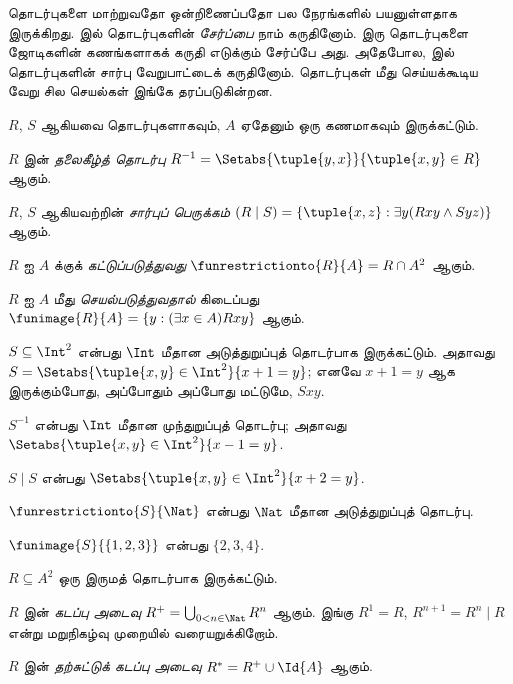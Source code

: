 \documentclass[../../../include/open-logic-section]{subfiles}
\begin{document}

தொடர்புகளை மாற்றுவதோ ஒன்றிணைப்பதோ பல நேரங்களில் பயனுள்ளதாக இருக்கிறது.
 இல் தொடர்புகளின்
\emph{சேர்ப்பை} நாம் கருதினோம். இரு தொடர்புகளை ஜோடிகளின் கணங்களாகக்
கருதி எடுக்கும் சேர்ப்பே அது. அதேபோல,
 இல் தொடர்புகளின் சார்பு
வேறுபாட்டைக் கருதினோம். தொடர்புகள் மீது செய்யக்கூடிய வேறு சில செயல்கள்
இங்கே தரப்படுகின்றன.

\begin{defn}
$R$, $S$ ஆகியவை தொடர்புகளாகவும், $A$ ஏதேனும் ஒரு கணமாகவும் இருக்கட்டும்.

$R$ இன் \emph{தலைகீழ்த் தொடர்பு}
$R^{-1} = \Setabs{\tuple{y, x}}{\tuple{x,
    y} \in R}$ ஆகும்.

$R$, $S$ ஆகியவற்றின் \emph{சார்புப் பெருக்கம்}
$(R \mid S) =
\{\tuple{x, z} : \exists y(Rxy \land Syz)\}$ ஆகும்.

$R$ ஐ $A$ க்குக் \emph{கட்டுப்படுத்துவது}
$\funrestrictionto{R}{A}= R
\cap A^2$ ஆகும்.

$R$ ஐ $A$ மீது \emph{செயல்படுத்துவதால்} கிடைப்பது
$\funimage{R}{A} = \{y :
(\exists x \in A)Rxy\}$ ஆகும்.
\end{defn}

\begin{ex}
$S \subseteq \Int^2$ என்பது $\Int$ மீதான அடுத்துறுப்புத் தொடர்பாக
இருக்கட்டும். அதாவது
$S = \Setabs{\tuple{x, y} \in \Int^2}{x + 1 = y}$; எனவே
$x + 1 = y$ ஆக இருக்கும்போது, அப்போதும் அப்போது மட்டுமே, $Sxy$.

$S^{-1}$ என்பது $\Int$ மீதான முந்துறுப்புத் தொடர்பு; அதாவது
$\Setabs{\tuple{x,y}\in\Int^2}{x -1 =y}$.

$S\mid S$ என்பது
$ \Setabs{\tuple{x,y}\in\Int^2}{x + 2 =y}$.

$\funrestrictionto{S}{\Nat}$ என்பது $\Nat$ மீதான அடுத்துறுப்புத் தொடர்பு.

$\funimage{S}{\{1,2,3\}}$ என்பது $\{2, 3, 4\}$.
\end{ex}

\begin{defn}[கடப்பு அடைவு]
$R \subseteq A^2$ ஒரு இருமத் தொடர்பாக இருக்கட்டும்.

$R$ இன் \emph{கடப்பு அடைவு}
$R^+ = \bigcup_{0 < n \in
\Nat} R^n$ ஆகும். இங்கு $R^1 = R$, $R^{n+1} = R^n
\mid R$ என்று மறுநிகழ்வு முறையில் வரையறுக்கிறோம்.

$R$ இன் \emph{தற்சுட்டுக் கடப்பு அடைவு}
$R^* = R^+ \cup
\Id{A}$ ஆகும்.
\end{defn}
\end{document}

